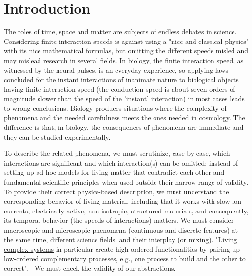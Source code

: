 
\section{Introduction\label{sec:Physics-Introduction}}


The roles of time, space and matter are subjects of endless debates in science.
Considering finite interaction speeds is against using a "nice and classical physics"
with its nice mathematical formulas, but omitting the different speeds
misled and may mislead research in several fields.
In biology, the finite interaction speed, as witnessed by the neural pulses, is an everyday experience, so applying laws concluded for the instant interactions of inanimate nature to biological objects having finite interaction speed (the conduction speed is about seven orders of magnitude slower than the speed of the 'instant' interaction) in most cases leads to wrong conclusions.
Biology produces situations where the complexity of phenomena
and the needed carefulness meets the ones needed in cosmology.
The difference is that, in biology, the consequences of phenomena are immediate
and they can be studied experimentally.


To describe the related phenomena, we must scrutinize, case by case, which interactions are significant and
which interaction(s) can be omitted; instead of setting up ad-hoc models for living matter that contradict
each other and fundamental scientific principles when used outside their narrow range of validity. To provide their
correct physics-based description, we must understand the corresponding behavior of living material, including that it works with slow ion currents,
electrically active, non-isotropic, structured materials,
and consequently, its temporal behavior (the speeds of interactions)
matters. We must consider macroscopic and microscopic phenomena (continuous and discrete features) at the same time, different
science fields, and their interplay (or mixing). "\href{https://www.pnas.org/doi/10.1073/pnas.1705704114}{Living complex systems} in
particular create high-ordered functionalities by pairing up low-ordered
complementary processes, e.g., one process to build and the other
to correct".~\cite{BiologicalConservationLaw:2017}
We must check the validity of our abstractions.


